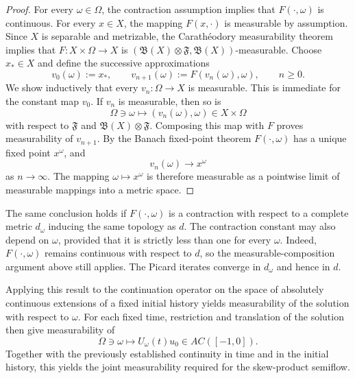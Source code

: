 \documentclass[reqno]{amsart}
\theoremstyle{plain}
\numberwithin{equation}{section}
\numberwithin{definition}{section}
\begin{document}
{\begin{proof}
For every $\omega\in\Omega$, the contraction assumption
implies that $F(\cdot,\omega)$ is continuous.
For every $x\in X$, the mapping $F(x,\cdot)$ is measurable
by assumption. Since $X$ is separable and metrizable,
the Carath\'eodory measurability theorem
\cite[Lemma~4.51]{AliB} implies that $ F:X\times\Omega\to X$
is $(\mathfrak B(X)\otimes\mathfrak F,\mathfrak B(X))$-measurable. Choose $x_*\in X$ and define the successive approximations
\begin{equation*}
    v_0(\omega):=x_*,
    \qquad
    v_{n+1}(\omega):=F(v_n(\omega),\omega),
    \qquad n\geq0.
\end{equation*}
We show inductively that every $v_n:\Omega\to X$ is
measurable. This is immediate for the constant map $v_0$.
If $v_n$ is measurable, then so is
\begin{equation*}
    \Omega\ni\omega\mapsto(v_n(\omega),\omega)
    \in X\times\Omega
\end{equation*}
with respect to $\mathfrak F$ and
$\mathfrak B(X)\otimes\mathfrak F$.
Composing this map with $F$ proves measurability of
$v_{n+1}$. By the Banach
fixed-point theorem $F(\cdot,\omega)$ has a unique
fixed point $x^\omega$, and
\begin{equation*}
    v_n(\omega)\to x^\omega
\end{equation*}
as $n\to\infty$. The mapping $\omega\mapsto x^\omega$ is therefore measurable
as a pointwise limit of measurable mappings into a metric
space.
\end{proof}

The same conclusion holds if $F(\cdot,\omega)$ is a
contraction with respect to a complete metric $d_\omega$
inducing the same topology as $d$.
The contraction constant may also depend on $\omega$,
provided that it is strictly less than one for every
$\omega$. Indeed, $F(\cdot,\omega)$ remains continuous with respect to $d$, so the measurable-composition argument above
still applies. The Picard iterates converge in $d_\omega$
and hence in $d$.

Applying this result to the continuation operator on the
space of absolutely continuous extensions of a fixed initial history yields measurability of the solution
with respect to $\omega$.
For each fixed time, restriction and translation of the
solution then give measurability of
\begin{equation*}
    \Omega\ni\omega
    \mapsto U_\omega(t)u_0\in AC([-1,0]).
\end{equation*}
Together with the previously established continuity
in time and in the initial history, this yields the
joint measurability required for the skew-product
semiflow.
}
\end{document}
